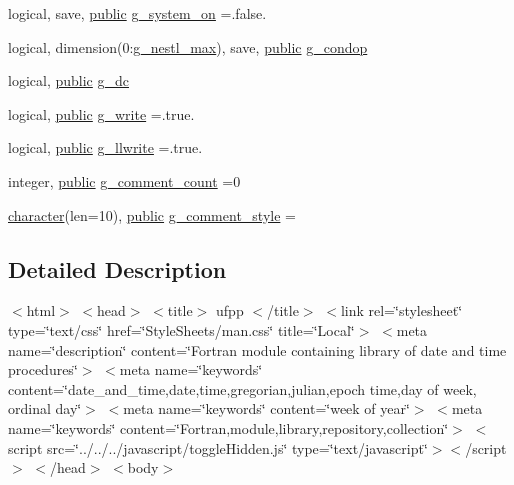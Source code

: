 \begin{DoxyCompactItemize}
logical, save, \hyperlink{M__stopwatch_83_8txt_a2f74811300c361e53b430611a7d1769f}{public} \hyperlink{namespacem__fpp_a7d10506aa84b640d172b33b3263bfa32}{g\+\_\+system\+\_\+on} =.false.
\item 
logical, dimension(0\+:\hyperlink{namespacem__fpp_a8d8e200282a7bfd05dfd73337a7bf4e0}{g\+\_\+nestl\+\_\+max}), save, \hyperlink{M__stopwatch_83_8txt_a2f74811300c361e53b430611a7d1769f}{public} \hyperlink{namespacem__fpp_a380f6ad747fc050f112465e63a371e82}{g\+\_\+condop}
\item 
logical, \hyperlink{M__stopwatch_83_8txt_a2f74811300c361e53b430611a7d1769f}{public} \hyperlink{namespacem__fpp_a546a9c9d569439024e367632ee6db908}{g\+\_\+dc}
\item 
logical, \hyperlink{M__stopwatch_83_8txt_a2f74811300c361e53b430611a7d1769f}{public} \hyperlink{namespacem__fpp_aeb0509a3fc389c28a37387d66ead31e3}{g\+\_\+write} =.true.
\item 
logical, \hyperlink{M__stopwatch_83_8txt_a2f74811300c361e53b430611a7d1769f}{public} \hyperlink{namespacem__fpp_a5939800574631e8265956e2bc2224a9f}{g\+\_\+llwrite} =.true.
\item 
integer, \hyperlink{M__stopwatch_83_8txt_a2f74811300c361e53b430611a7d1769f}{public} \hyperlink{namespacem__fpp_a3cbfb5247b11d5ebe1563b7cd1564c14}{g\+\_\+comment\+\_\+count} =0
\item 
\hyperlink{option__stopwatch_83_8txt_abd4b21fbbd175834027b5224bfe97e66}{character}(len=10), \hyperlink{M__stopwatch_83_8txt_a2f74811300c361e53b430611a7d1769f}{public} \hyperlink{namespacem__fpp_affffb83550152a13f0592ef4b30496b8}{g\+\_\+comment\+\_\+style} =\textquotesingle{} \textquotesingle{}
\end{DoxyCompactItemize}


\subsection{Detailed Description}
$<$html$>$ $<$head$>$ $<$title$>$ ufpp $<$/title$>$ $<$link rel=\char`\"{}stylesheet\char`\"{} type=\char`\"{}text/css\char`\"{} href=\char`\"{}\+Style\+Sheets/man.\+css\char`\"{} title=\char`\"{}\+Local\char`\"{}$>$ $<$meta name=\char`\"{}description\char`\"{} content=\char`\"{}\+Fortran module containing library of date and time procedures\char`\"{}$>$ $<$meta name=\char`\"{}keywords\char`\"{} content=\char`\"{}date\+\_\+and\+\_\+time,date,time,gregorian,julian,epoch time,day of week, ordinal day\char`\"{}$>$ $<$meta name=\char`\"{}keywords\char`\"{} content=\char`\"{}week of year\char`\"{}$>$ $<$meta name=\char`\"{}keywords\char`\"{} content=\char`\"{}\+Fortran,module,library,repository,collection\char`\"{}$>$ $<$script src=\char`\"{}../../../javascript/toggle\+Hidden.\+js\char`\"{} type=\char`\"{}text/javascript\char`\"{}$>$$<$/script$>$ $<$/head$>$ $<$body$>$

